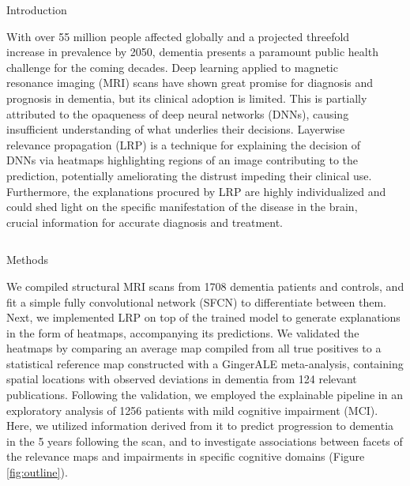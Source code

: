 \documentclass[final, 14pt]{beamer}
\def\verticalspace{0.61cm}
\begin{document}
\begin{frame}[t]
\begin{columns}[t]
    \begin{column}{.33\textwidth}
        \begin{block}{Introduction}
            \parbox{\linewidth}{\justify
With over 55 million people affected globally and a projected threefold increase in prevalence by 2050,
dementia presents a paramount public health challenge for the coming decades.
Deep learning applied to magnetic resonance imaging (MRI) scans have shown great promise for diagnosis and prognosis in dementia, but its clinical adoption is limited. This is partially attributed
to the opaqueness of deep neural networks (DNNs), causing insufficient understanding of what underlies their decisions.
Layerwise relevance propagation (LRP) is a technique for explaining the decision of DNNs via heatmaps highlighting regions of an
image contributing to the prediction, potentially ameliorating the distrust impeding their clinical use. Furthermore,
the explanations procured by LRP are highly individualized and could shed light on the specific manifestation of the disease in the brain,
crucial information for accurate diagnosis and treatment.
            }
        \end{block}
    \end{column}
    \begin{column}{.63\textwidth}
        
    \end{column}
\end{columns}

\vspace{\verticalspace}

\begin{columns}[t]
  \begin{column}{.33\textwidth}

    \begin{block}{Methods}
        \parbox{\linewidth}{\justify
We compiled structural MRI scans from 1708 dementia patients and controls, and fit
a simple fully convolutional network (SFCN) to differentiate between them. Next, we implemented LRP on top of the trained
model to generate explanations in the form of heatmaps, accompanying its predictions. We validated the heatmaps by comparing an
average map compiled from all true positives to a statistical reference map constructed with a GingerALE meta-analysis,
containing spatial locations with observed deviations in dementia from 124 relevant publications. Following the validation, we employed the explainable pipeline
in an exploratory analysis of 1256 patients with mild cognitive impairment (MCI). Here, we utilized information derived from it
to predict progression to dementia in the 5 years following the scan, and to investigate associations between facets of the relevance maps
and impairments in specific cognitive domains (Figure \ref{fig:outline}).
        }
    \end{block}


\end{column}
\end{columns}
\end{frame}
\end{document}
